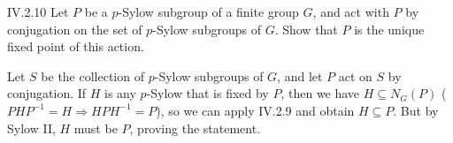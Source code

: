 \begin{problem}{IV.2.10}
Let $P$ be a $p$-Sylow subgroup of a finite group $G$, and act with $P$ by conjugation on the set of $p$-Sylow subgroups of $G$. Show that $P$ is the unique fixed point of this action.
\end{problem}
\begin{pf}
Let $S$ be the collection of $p$-Sylow subgroups of $G$, and let $P$ act on $S$ by conjugation. If $H$ is any $p$-Sylow that is fixed by $P$, then we have $H \subseteq N_G(P)$ ($PHP^{-1} = H \Rightarrow HPH^{-1} = P$), so we can apply IV.2.9 and obtain $H \subseteq P$. But by Sylow II, $H$ must be $P$, proving the statement. 
\end{pf}